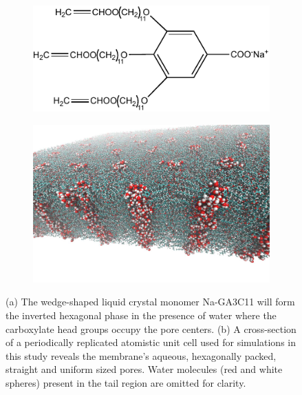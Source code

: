 \documentclass[aps,pre,preprint,groupedaddress,longbibliography]{revtex4-2}
\begin{document}
  \begin{figure}
  \centering
  \begin{subfigure}{0.4\textwidth}
  \centering
  \vspace{1.1cm}
  \includegraphics[width=\textwidth]{NaGA3C11.pdf}
  \vspace{0.6cm}
  \caption{}\label{fig:monomer_structure}
  \end{subfigure}
  \begin{subfigure}{0.5\textwidth}
  \centering
  \includegraphics[width=\textwidth]{membrane_profile.pdf}
  \caption{}\label{fig:membrane_profile}
  \end{subfigure}
  \caption{(a) The wedge-shaped liquid crystal monomer Na-GA3C11 will form the inverted
  hexagonal phase in the presence of water where the carboxylate head groups occupy the
  pore centers. (b) A cross-section of a periodically replicated atomistic unit cell 
  used for simulations in this study reveals the membrane's aqueous, hexagonally packed,
  straight and uniform sized pores. Water molecules (red and white spheres) present in 
  the tail region are omitted for clarity.}\label{fig:membrane_structure}
  \end{figure}
  
\end{document}
